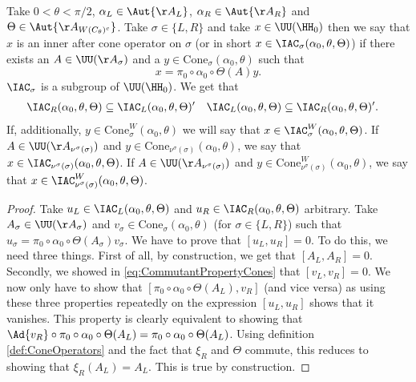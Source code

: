 \begin{definition}
	Take $0<\theta<\pi/2$, $\alpha_L\in\Aut{\AA_{L}}$, $\alpha_R\in\Aut{\AA_{R}}$ and $\Theta\in\Aut{\AA_{W(C_\theta)^c}}$. Take $\sigma\in\{L,R\}$ and take $x\in\UU(\HH_0)$ then we say that $x$ is an inner after cone operator on $\sigma$ (or in short $x\in \IAC_\sigma(\alpha_0,\theta,\Theta)$) if there exists an $A\in\UU(\AA_\sigma)$ and a $y\in\textrm{Cone}_\sigma(\alpha_0,\theta)$ such that
	\begin{equation}
		x=\pi_0\circ\alpha_0\circ\Theta(A)y.
	\end{equation}
	$\IAC_\sigma$ is a subgroup of $\UU(\HH_0)$. We get that
	\begin{align}\label{eq:CommutantProperty}
		\IAC_R(\alpha_0,\theta,\Theta)&\subseteq\IAC_L(\alpha_0,\theta,\Theta)'&\IAC_L(\alpha_0,\theta,\Theta)&\subseteq\IAC_R(\alpha_0,\theta,\Theta)'.
	\end{align}
	If, additionally, $y\in \textrm{Cone}_\sigma^W(\alpha_0,\theta)$ we will say that $x\in \IAC_\sigma^W(\alpha_0,\theta,\Theta)$. If $A\in\UU(\AA_{\nu^\sigma(\sigma)})$ and $y\in \textrm{Cone}_{\nu^\sigma(\sigma)}(\alpha_0,\theta)$, we say that $x\in\IAC_{\nu^\sigma(\sigma)}(\alpha_0,\theta,\Theta)$. If $A\in\UU(\AA_{\nu^\sigma(\sigma)})$ and $y\in \textrm{Cone}_{\nu^\sigma(\sigma)}^W(\alpha_0,\theta)$, we say that $x\in\IAC_{\nu^\sigma(\sigma)}^W(\alpha_0,\theta,\Theta)$.
\end{definition}
\begin{proof}
	Take $u_L\in\IAC_L(\alpha_0,\theta,\Theta)$ and $u_R\in\IAC_R(\alpha_0,\theta,\Theta)$ arbitrary. Take $A_\sigma\in\UU(\AA_\sigma)$ and $v_\sigma\in\textrm{Cone}_\sigma(\alpha_0,\theta)$ (for $\sigma\in\{L,R\}$) such that $u_\sigma=\pi_0\circ\alpha_0\circ\Theta(A_\sigma)v_\sigma$. We have to prove that $[u_L,u_R]=0$. To do this, we need three things. First of all, by construction, we get that $[A_L,A_R]=0$. Secondly, we showed in \ref{eq:CommutantPropertyCones} that $[v_L,v_R]=0$. We now only have to show that $[\pi_0\circ\alpha_0\circ\Theta(A_L),v_R]$ (and vice versa) as using these three properties repeatedly on the expression $[u_L,u_R]$ shows that it vanishes. This property is clearly equivalent to showing that $\Ad{v_R}\circ \pi_0\circ\alpha_0\circ\Theta(A_L)=\pi_0\circ\alpha_0\circ\Theta(A_L)$. Using definition \ref{def:ConeOperators} and the fact that $\xi_R$ and $\Theta$ commute, this reduces to showing that $\xi_R(A_L)=A_L$. This is true by construction.
\end{proof}
